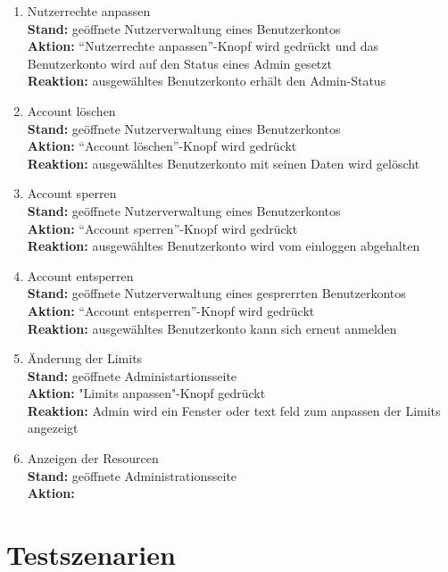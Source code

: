 \begin{enumerate}
    \item Nutzerrechte anpassen
    \\ \textbf{Stand:} geöffnete Nutzerverwaltung eines Benutzerkontos
    \\ \textbf{Aktion:} \enquote{Nutzerrechte anpassen}-Knopf wird gedrückt und das Benutzerkonto wird auf den Status eines \Gls{Admin} gesetzt
    \\ \textbf{Reaktion:} ausgewähltes Benutzerkonto erhält den \Gls{Admin}-Status
    \item Account löschen
    \\ \textbf{Stand:} geöffnete Nutzerverwaltung eines Benutzerkontos
    \\ \textbf{Aktion:} \enquote{Account löschen}-Knopf wird gedrückt
    \\ \textbf{Reaktion:} ausgewähltes Benutzerkonto mit seinen Daten wird gelöscht
    \item Account sperren
    \\ \textbf{Stand:} geöffnete Nutzerverwaltung eines Benutzerkontos
    \\ \textbf{Aktion:} \enquote{Account sperren}-Knopf wird gedrückt
    \\ \textbf{Reaktion:} ausgewähltes Benutzerkonto wird vom einloggen abgehalten
    \item Account entsperren
    \\ \textbf{Stand:} geöffnete Nutzerverwaltung eines gesprerrten Benutzerkontos
    \\ \textbf{Aktion:} \enquote{Account entsperren}-Knopf wird gedrückt
    \\ \textbf{Reaktion:} ausgewähltes Benutzerkonto kann sich erneut anmelden
    \item Änderung der Limits
    \\ \textbf{Stand:} geöffnete Administartionsseite
    \\ \textbf{Aktion:} "Limits anpassen"-Knopf gedrückt
    \\ \textbf{Reaktion:} \gls{Admin} wird ein Fenster oder text feld zum anpassen der Limits angezeigt
    \item Anzeigen der Resourcen
    \\ \textbf{Stand:} geöffnete Administrationsseite
    \\ \textbf{Aktion:}
\end{enumerate}


\section{Testszenarien}

